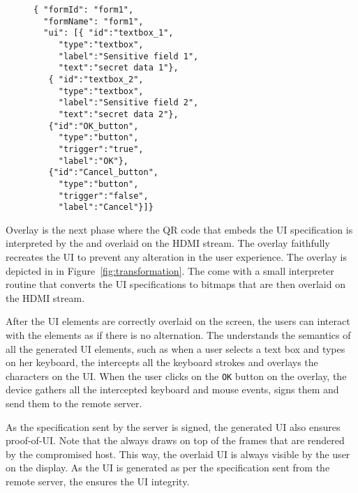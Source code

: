 \begin{figure}[t]
\begin{lstlisting}[mathescape=true]
{ "formId": "form1",
  "formName": "form1",
  "ui": [{ "id":"textbox_1",
     "type":"textbox",
     "label":"Sensitive field 1",
     "text":"secret data 1"},
   { "id":"textbox_2",
     "type":"textbox",
     "label":"Sensitive field 2",
     "text":"secret data 2"},
   {"id":"OK_button",
     "type":"button",
     "trigger":"true",
     "label":"OK"},    
   {"id":"Cancel_button",
     "type":"button",
     "trigger":"false",
     "label":"Cancel"}]}
\end{lstlisting}
\end{figure}



 Overlay is the next phase where the QR code that embeds the UI specification is interpreted by the \device and overlaid on the HDMI stream. The overlay faithfully recreates the UI to prevent any alteration in the user experience. The \device overlay is depicted in \three in Figure~\ref{fig:transformation}. The \device come with a small interpreter routine that converts the UI specifications to bitmaps that are then overlaid on the HDMI stream. 

 After the UI elements are correctly overlaid on the screen, the users can interact with the elements as if there is no alternation. The \device understands the semantics of all the generated UI elements, such as when a user selects a text box and types on her keyboard, the \device intercepts all the keyboard strokes and overlays the characters on the UI. When the user clicks on the \texttt{OK} button on the overlay, the device gathers all the intercepted keyboard and mouse events, signs them and send them to the remote server.  

 As the specification sent by the server is signed, the generated UI also ensures proof-of-UI. Note that the \device always draws on top of the frames that are rendered by the compromised host. This way, the overlaid UI is always visible by the user on the display. As the UI is generated as per the specification sent from the remote server, the \device ensures the UI integrity.


